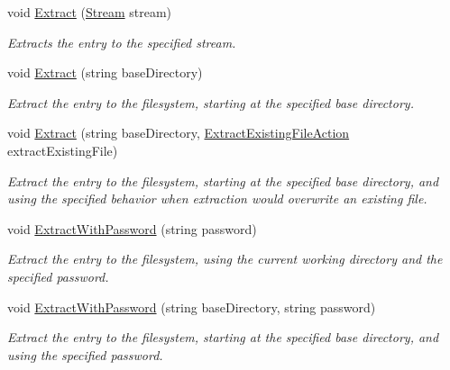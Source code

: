 \begin{DoxyCompactItemize}
void \mbox{\hyperlink{class_super_tiled2_unity_1_1_ionic_1_1_zip_1_1_zip_entry_a13e055aec36ff9eb116526778dd413fe}{Extract}} (\mbox{\hyperlink{namespace_super_tiled2_unity_1_1_ionic_1_1_zip_a9ced5352c56e7e0fceff15b534073c83aeae835e83c0494a376229f254f7d3392}{Stream}} stream)
\begin{DoxyCompactList}\small\item\em Extracts the entry to the specified stream. \end{DoxyCompactList}\item 
void \mbox{\hyperlink{class_super_tiled2_unity_1_1_ionic_1_1_zip_1_1_zip_entry_a9620a0b7f21b2ae639d555d8f6a528d5}{Extract}} (string base\+Directory)
\begin{DoxyCompactList}\small\item\em Extract the entry to the filesystem, starting at the specified base directory. \end{DoxyCompactList}\item 
void \mbox{\hyperlink{class_super_tiled2_unity_1_1_ionic_1_1_zip_1_1_zip_entry_a704fdbf9a9838692b6fbf4fa2991cca8}{Extract}} (string base\+Directory, \mbox{\hyperlink{namespace_super_tiled2_unity_1_1_ionic_1_1_zip_a3f8db7242d746d36b45114257b4fe4c0}{Extract\+Existing\+File\+Action}} extract\+Existing\+File)
\begin{DoxyCompactList}\small\item\em Extract the entry to the filesystem, starting at the specified base directory, and using the specified behavior when extraction would overwrite an existing file. \end{DoxyCompactList}\item 
void \mbox{\hyperlink{class_super_tiled2_unity_1_1_ionic_1_1_zip_1_1_zip_entry_a346d1d4eaf4ccb1274fe31629f3cb429}{Extract\+With\+Password}} (string password)
\begin{DoxyCompactList}\small\item\em Extract the entry to the filesystem, using the current working directory and the specified password. \end{DoxyCompactList}\item 
void \mbox{\hyperlink{class_super_tiled2_unity_1_1_ionic_1_1_zip_1_1_zip_entry_a866b689638268d28d95bc075b350b4d9}{Extract\+With\+Password}} (string base\+Directory, string password)
\begin{DoxyCompactList}\small\item\em Extract the entry to the filesystem, starting at the specified base directory, and using the specified password. \end{DoxyCompactList}\item 

\end{DoxyCompactItemize}
